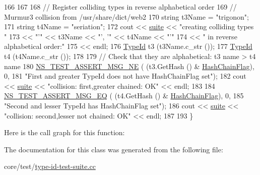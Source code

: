 \begin{DoxyCode}
166 
167 
168   \textcolor{comment}{// Register colliding types in reverse alphabetical order}
169   \textcolor{comment}{// Murmur3 collision from /usr/share/dict/web2}
170   \textcolor{keywordtype}{string} t3Name = \textcolor{stringliteral}{"trigonon"};
171   \textcolor{keywordtype}{string} t4Name = \textcolor{stringliteral}{"seriation"};
172   cout << \hyperlink{type-id-test-suite_8cc_ab4acb0fe33ca0947f675eed6196ed8ca}{suite} << \textcolor{stringliteral}{"creating colliding types "}
173        << \textcolor{stringliteral}{"'"} << t3Name << \textcolor{stringliteral}{"', '"} << t4Name << \textcolor{stringliteral}{"'"}
174        << \textcolor{stringliteral}{" in reverse alphabetical order:"}
175        << endl;
176   \hyperlink{classns3_1_1TypeId}{TypeId} t3 (t3Name.c\_str ());
177   \hyperlink{classns3_1_1TypeId}{TypeId} t4 (t4Name.c\_str ());
178 
179   \textcolor{comment}{// Check that they are alphabetical: t3 name > t4 name}
180   \hyperlink{group__testing_ga73d66fb0050a5111453fd144e767b91a}{NS\_TEST\_ASSERT\_MSG\_NE} ( (t3.GetHash () & \hyperlink{classCollisionTestCase_a548cc857844db44014bb02d25b46008ea91195d2ad8d7721b7e17cb95bbd76be5}{HashChainFlag}), 0,
181                           \textcolor{stringliteral}{"First and greater TypeId does not have HashChainFlag set"});
182   cout << \hyperlink{type-id-test-suite_8cc_ab4acb0fe33ca0947f675eed6196ed8ca}{suite} << \textcolor{stringliteral}{"collision: first,greater     chained: OK"} << endl;
183 
184   \hyperlink{group__testing_ga2a9d78cffb3db8e867c35fff0b698cf5}{NS\_TEST\_ASSERT\_MSG\_EQ} ( (t4.GetHash () & \hyperlink{classCollisionTestCase_a548cc857844db44014bb02d25b46008ea91195d2ad8d7721b7e17cb95bbd76be5}{HashChainFlag}), 0,
185                           \textcolor{stringliteral}{"Second and lesser TypeId has HashChainFlag set"});
186   cout << \hyperlink{type-id-test-suite_8cc_ab4acb0fe33ca0947f675eed6196ed8ca}{suite} << \textcolor{stringliteral}{"collision: second,lesser not chained: OK"} << endl;
187 
193 \}
\end{DoxyCode}


Here is the call graph for this function\+:




The documentation for this class was generated from the following file\+:\begin{DoxyCompactItemize}
\item 
core/test/\hyperlink{type-id-test-suite_8cc}{type-\/id-\/test-\/suite.\+cc}\end{DoxyCompactItemize}
